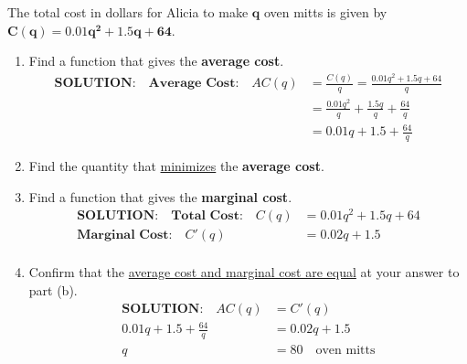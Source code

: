 \begin{example}
The total cost in dollars for Alicia to make $\bm{q}$ oven mitts is given by $\bm{C(q)=0.01q^2+1.5q+64}$.
\renewcommand{\labelenumi}{(\alph{enumi})}
\begin{enumerate}[leftmargin=*]
    \item Find a function that gives the \textbf{average cost}.\\
    	\begin{displaymath}
		\begin{split}
		\textbf{SOLUTION:} \quad	\textbf{Average Cost:}\quad AC(q) &=\frac{C(q)}{q}=\frac{0.01q^2+1.5q+64}{q}\\
			                                  &=\frac{0.01q^2}{q}+\frac{1.5q}{q}+\frac{64}{q}\\
			                                  &=0.01q+1.5+\frac{64}{q}
		\end{split}
	\end{displaymath}
	\newpage
    \item Find the quantity that \underline{minimizes} the \textbf{average cost}.
    \vspace*{6in}
    \item Find a function that gives the \textbf{marginal cost}.\\
    	\begin{displaymath}
		\begin{split}
		\textbf{SOLUTION:} \quad \textbf{Total Cost:}\quad C(q) &=0.01q^2+1.5q+64\\
			\textbf{Marginal Cost:}\quad C'(q) &=0.02q+1.5\\
		\end{split}
	\end{displaymath}
    \item Confirm that the \underline{average cost and marginal cost are equal} at your answer to part (b).\\
    
    	\begin{displaymath}
		\begin{split}
	\textbf{SOLUTION:} \quad	AC(q) &=C'(q)\\
	   0.01q+1.5+\frac{64}{q} &=0.02q+1.5\\
	   q&=80 \quad \text{oven mitts}
		\end{split}
	\end{displaymath}
\end{enumerate}
    \begin{sol}
    

\end{sol}
\end{example}
